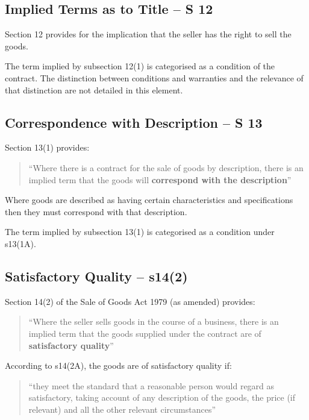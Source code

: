 \documentclass[
]{article}
\begin{document}
\hypertarget{implied-terms-as-to-title-s-12}{%
\subsection{Implied Terms as to Title -- S
12}\label{implied-terms-as-to-title-s-12}}

Section 12 provides for the implication that the seller has the right to
sell the goods.

The term implied by subsection 12(1) is categorised as a condition of
the contract. The distinction between conditions and warranties and the
relevance of that distinction are not detailed in this element.

\hypertarget{correspondence-with-description-s-13}{%
\subsection{Correspondence with Description -- S
13}\label{correspondence-with-description-s-13}}

Section 13(1) provides:

\begin{quote}
``Where there is a contract for the sale of goods by description, there
is an implied term that the goods will \textbf{correspond with the
description}''
\end{quote}

Where goods are described as having certain characteristics and
specifications then they must correspond with that description.

The term implied by subsection 13(1) is categorised as a condition under
s13(1A).

\hypertarget{satisfactory-quality-s142}{%
\subsection{Satisfactory Quality --
s14(2)}\label{satisfactory-quality-s142}}

Section 14(2) of the Sale of Goods Act 1979 (as amended) provides:

\begin{quote}
``Where the seller sells goods in the course of a business, there is an
implied term that the goods supplied under the contract are of
\textbf{satisfactory quality}''
\end{quote}

According to s14(2A), the goods are of satisfactory quality if:

\begin{quote}
``they meet the standard that a reasonable person would regard as
satisfactory, taking account of any description of the goods, the price
(if relevant) and all the other relevant circumstances''
\end{quote}
\end{document}
